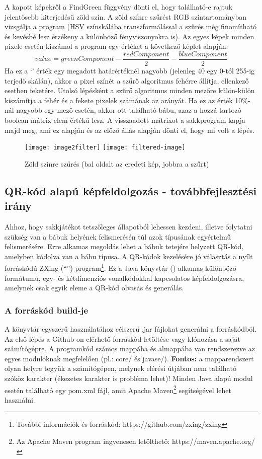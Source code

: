 \documentclass[../documentation.tex]{subfiles}
\begin{document}
A kapott képekről a FindGreen függvény dönti el, hogy található-e rajtuk jelentősebb kiterjedésű zöld szín. A zöld színre szűrést RGB színtartományban vizsgálja a program (HSV színskálába transzformálással a szűrés még finomítható és kevésbé lesz érzékeny a különböző fényviszonyokra is). Az egyes képek minden pixele esetén kiszámol a program egy értéket a következő képlet alapján:
\[value = greenComponent - \dfrac{redComponent}{2}  - \dfrac{blueComponent}{2}\]
Ha ez a `' érték egy megadott határértéknél nagyobb (jelenleg 40 egy 0-tól 255-ig terjedő skálán), akkor a pixel színét a szűrő algoritmus fehérre állítja, ellenkező esetben feketére. Utolsó lépésként a szűrő algoritmus minden mezőre külön-külön kiszámítja a fehér és a fekete pixelek számának az arányát. Ha ez az érték 10\%-nál nagyobb egy mező esetén, akkor ott található bábu, azaz a hozzá tartozó boolean mátrix elem  értékű lesz. A visszaadott mátrixot a sakkprogram kapja majd meg, ami ez alapján és az előző állás alapján dönti el, hogy mi volt a lépés.

\begin{figure}[h]
\centering
	\texttt{[image: image2filter]}
	\texttt{[image: filtered-image]}
\caption{Zöld színre szűrés (bal oldalt az eredeti kép, jobbra a szűrt)}
\label{fig:colorfiltering}
\end{figure}


\subsection{QR-kód alapú képfeldolgozás - továbbfejlesztési irány} \label{qrsection}
Ahhoz, hogy sakkjátékot tetszőleges állapotból lehessen kezdeni, illetve folytatni szükség van a bábuk helyének felismerésén túl azok típusának egyértelmű felismerésére. Erre alkamas megoldás lehet a bábuk tetejére helyzett QR-kód, amelyben kódolva van a bábu típusa. A QR-kódok kezelésére jó választás a nyílt forráskódú ZXing (``'') program\footnote{További információk és forráskód: https://github.com/zxing/zxing}. Ez a Java könyvtár () alkamas különböző formátumú, egy- és kétdimenziós vonalkódokkal kapcsolatos képfeldolgozásra, amelynek csak egyik eleme a QR-kód olvasás és generálás.

\subsubsection{A forráskód build-je}
A könyvtár egyszerű használatához célszerű .jar fájlokat generálni a forráskódból. Az első lépés a Github-on elérhető forráskód letöltése vagy klónozása a saját számítógépre. A programkód számos mappába és almappába van rendszerezve az egyes moduloknak megfelelően (pl.: core/ és javase/). \textbf{Fontos:} a mapparendszert olyan helyre tegyük a számítógépen, melynek elérési útjában nem található szóköz karakter (ékezetes karakter is probléma lehet)! Minden Java alapú modul esetén található egy pom.xml fájl, amit Apache Maven\footnote{Az Apache Maven program ingyenesen letölthető: https://maven.apache.org/} segítségével lehet használni.
\end{document}
